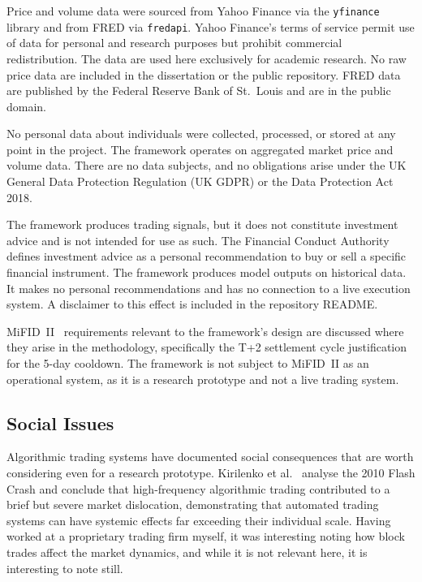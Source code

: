 \begin{appendices}
Price and volume data were sourced from Yahoo Finance via the \texttt{yfinance} library and from FRED via \texttt{fredapi}. Yahoo Finance's terms of service permit use of data for personal and research purposes but prohibit commercial redistribution. The data are used here exclusively for academic research. No raw price data are included in the dissertation or the public repository. FRED data are published by the Federal Reserve Bank of St.\ Louis and are in the public domain.

No personal data about individuals were collected, processed, or stored at any point in the project. The framework operates on aggregated market price and volume data. There are no data subjects, and no obligations arise under the UK General Data Protection Regulation (UK GDPR) or the Data Protection Act 2018.

The framework produces trading signals, but it does not constitute investment advice and is not intended for use as such. The Financial Conduct Authority~\cite{fca2018} defines investment advice as a personal recommendation to buy or sell a specific financial instrument. The framework produces model outputs on historical data. It makes no personal recommendations and has no connection to a live execution system. A disclaimer to this effect is included in the repository README.

MiFID~II~\cite{mifid2014} requirements relevant to the framework's design are discussed where they arise in the methodology, specifically the T+2 settlement cycle justification for the 5-day cooldown. The framework is not subject to MiFID~II as an operational system, as it is a research prototype and not a live trading system.

\subsection{Social Issues}
\label{subsec:social}

Algorithmic trading systems have documented social consequences that are worth considering even for a research prototype. Kirilenko et al.~\cite{kirilenko2017} analyse the 2010 Flash Crash and conclude that high-frequency algorithmic trading contributed to a brief but severe market dislocation, demonstrating that automated trading systems can have systemic effects far exceeding their individual scale. Having worked at a proprietary trading firm myself, it was interesting noting how block trades affect the market dynamics, and while it is not relevant here, it is interesting to note still. 


\end{appendices}
